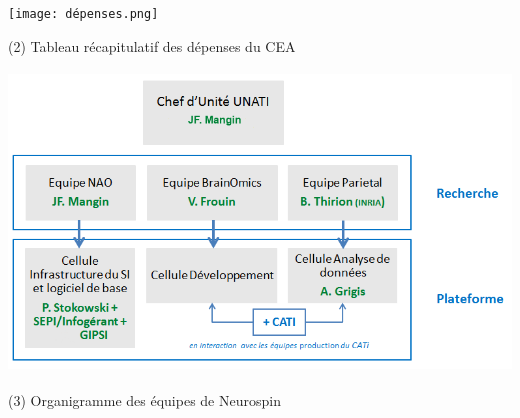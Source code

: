 \documentclass[12pt, oneside, a4paper, titlepage]{article}
\begin{document}
 \centerline{\texttt{[image: dépenses.png]}}
  \centerline{ (2) Tableau récapitulatif des dépenses du CEA}
 \vspace{5mm} 

 \centerline{\includegraphics[width=14cm, height=8cm]{orga.png}}
   \centerline{ (3) Organigramme des équipes de Neurospin}
 \vspace{5mm} 
  
\end{document}
